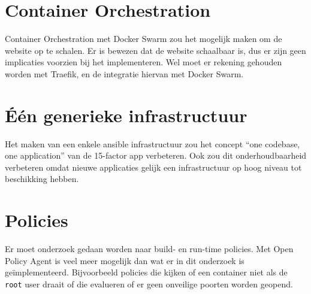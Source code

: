 \section{Container Orchestration}
Container Orchestration met Docker Swarm zou het mogelijk maken om de website op te schalen. Er is bewezen dat de website schaalbaar is, dus er zijn geen implicaties voorzien bij het implementeren. Wel moet er rekening gehouden worden met Traefik, en de integratie hiervan met Docker Swarm.

\section{Één generieke infrastructuur}
Het maken van een enkele ansible infrastructuur zou het concept \enquote{one codebase, one application} van de 15-factor app verbeteren. Ook zou dit onderhoudbaarheid verbeteren omdat nieuwe applicaties gelijk een infrastructuur op hoog niveau tot beschikking hebben.

\section{Policies}
Er moet onderzoek gedaan worden naar build- en run-time policies. Met Open Policy Agent is veel meer mogelijk dan wat er in dit onderzoek is geïmplementeerd. Bijvoorbeeld policies die kijken of een container niet als de \texttt{root} user draait of die evalueren of er geen onveilige poorten worden geopend.